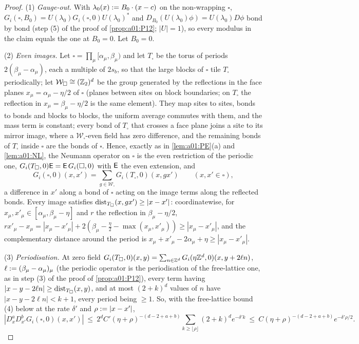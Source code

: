 \begin{proof}
(1) \emph{Gauge-out.} With $\lambda_0(x):= B_0\cdot(x-c)$ on the non-wrapping $\square$, $G_i(\square,B_0)=U(\lambda_0)G_i(\square,0)U(\lambda_0)^*$ and $D_{B_0}(U(\lambda_0)\phi)=U(\lambda_0)D\phi$ bond by bond (step (5) of the proof of \cref{prop:a01:P12}; $|U|=1$), so every modulus in the claim equals the one at $B_0=0$. Let $B_0=0$.

(2) \emph{Even images.} Let $\square=\prod_\mu[\alpha_\mu,\beta_\mu)$ and let $T_\square$ be the torus of periods $2(\beta_\mu-\alpha_\mu)$, each a multiple of $2s_b$, so that the large blocks of $\square$ tile $T_\square$ periodically; let $\mathcal W_\square\cong(\mathbb Z_2)^d$ be the group generated by the reflections in the face planes $x_\mu=\alpha_\mu-\eta/2$ of $\square$ (planes between sites on block boundaries; on $T_\square$ the reflection in $x_\mu=\beta_\mu-\eta/2$ is the same element). They map sites to sites, bonds to bonds and blocks to blocks, the uniform average commutes with them, and the mass term is constant; every bond of $T_\square$ that crosses a face plane joins a site to its mirror image, where a $\mathcal W_\square$-even field has zero difference, and the remaining bonds of $T_\square$ inside $\square$ are the bonds of $\square$. Hence, exactly as in \cref{lem:a01:PE}(a) and \cref{lem:a01:NL}, the Neumann operator on $\square$ is the even restriction of the periodic one, $G_i(T_\square,0)\mathsf E=\mathsf E\,G_i(\square,0)$ with $\mathsf E$ the even extension, and
\[
G_i(\square,0)(x,x')=\sum_{g\in\mathcal W_\square}G_i(T_\square,0)(x,gx')\qquad(x,x'\in\square),
\]
a difference in $x'$ along a bond of $\square$ acting on the image terms along the reflected bonds. Every image satisfies $\operatorname{dist}_{T_\square}(x,gx')\ge|x-x'|$: coordinatewise, for $x_\mu,x'_\mu\in[\alpha_\mu,\beta_\mu-\eta]$ and $r$ the reflection in $\beta_\mu-\eta/2$, $rx'_\mu-x_\mu=|x_\mu-x'_\mu|+2(\beta_\mu-\tfrac\eta2-\max(x_\mu,x'_\mu))\ge|x_\mu-x'_\mu|$, and the complementary distance around the period is $x_\mu+x'_\mu-2\alpha_\mu+\eta\ge|x_\mu-x'_\mu|$.

(3) \emph{Periodisation.} At zero field $G_i(T_\square,0)(x,y)=\sum_{n\in\mathbb Z^d}G_i(\eta\mathbb Z^d,0)(x,y+2\ell n)$, $\ell:=(\beta_\mu-\alpha_\mu)_\mu$ (the periodic operator is the periodisation of the free-lattice one, as in step (3) of the proof of \cref{prop:a01:P12}), every term having $|x-y-2\ell n|\ge\operatorname{dist}_{T_\square}(x,y)$, and at most $(2+k)^d$ values of $n$ have $|x-y-2\ell n|<k+1$, every period being $\ge1$. So, with the free-lattice bound (4) below at the rate $\delta'$ and $\rho:=|x-x'|$,
\[
|D^a_xD^b_{x'}G_i(\square,0)(x,x')|\ \le\ 2^dC'(\eta+\rho)^{-(d-2+a+b)}\sum_{k\ge\lfloor\rho\rfloor}(2+k)^de^{-\delta'k}\ \le\ C(\eta+\rho)^{-(d-2+a+b)}e^{-\delta'\rho/2}.
\]


\end{proof}
